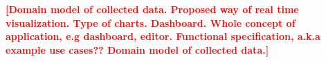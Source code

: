 \documentclass[thesis=B,english]{FITthesis}[2012/06/26]
\newcommand{\todo}[1]{\textcolor{red}{\textbf{[#1]}}}
\begin{document}
	\todo{Domain model of collected data. Proposed way of real time visualization. Type of charts. Dashboard. Whole concept of application, e.g dashboard, editor. Functional specification, a.k.a example use cases?? Domain model of collected data.}
    

    
    
    
    
   
\end{document}

